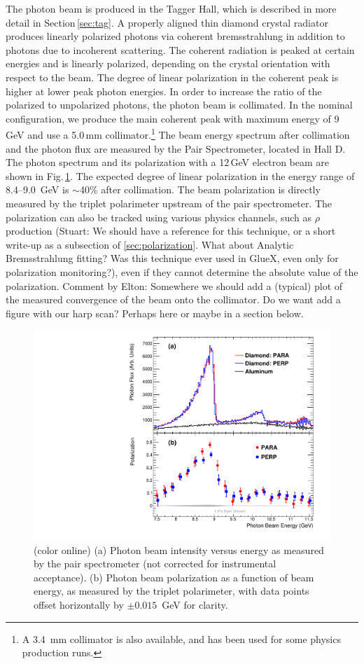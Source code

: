 The photon beam is produced in the Tagger Hall, which is described in more detail in Section\,\ref{sec:tag}.
A properly aligned thin diamond crystal radiator produces linearly polarized photons via coherent bremsstrahlung \cite{timm1969,LIVINGSTON2009205} in addition to photons due to incoherent scattering.
The coherent radiation is peaked at certain energies and is linearly polarized, depending on the crystal orientation with respect to the beam.
The degree of linear polarization in the coherent peak is higher at lower peak photon energies.
In order to increase the ratio of the polarized to unpolarized photons, the photon beam is collimated.  In the nominal \GX{} configuration, we produce the main coherent peak
with maximum energy of 9\,GeV and use a 5.0\,mm collimator.\footnote{A 3.4~mm collimator is also available, and has been used for some physics production runs.}
The beam energy spectrum after collimation and the photon flux are measured by the Pair
Spectrometer, located in Hall D. The photon spectrum and its polarization with a 12\,GeV electron beam are shown in Fig.\,\ref{fig:beam:gx3102_pi0etaAsym2016_fig0_beam}.
The expected degree of linear polarization in the energy range of 8.4--9.0~GeV is $\sim$40\% after collimation. 
The beam polarization is directly measured by the triplet polarimeter upstream of the pair spectrometer. The polarization can also be tracked using various physics channels, such as $\rho$ production {\color{red}(Stuart: We should have a reference for this technique, or a short write-up as a subsection of \ref{sec:polarization}.  What about Analytic Bremsstrahlung fitting? Was this technique ever used in GlueX, even only for polarization monitoring?)}, even if they cannot determine the absolute value of the polarization. 
{\color{red} Comment by Elton: Somewhere we should add a (typical) plot of the measured convergence of the beam onto the collimator. Do we want add a figure with our harp scan? Perhaps here or maybe in a section below.} 

  
\begin{figure}[t]
\begin{center}
 \includegraphics[clip=true,width=0.5\linewidth]{figures/gx3102_pi0etaAsym2016_fig0_beam.pdf}
\end{center}
\caption{(color online) (a) Photon beam intensity versus energy as measured by the pair spectrometer (not corrected for instrumental acceptance).  (b) Photon beam polarization as a function of beam energy, as measured by the triplet polarimeter, with data points offset horizontally by $\pm0.015$~GeV for clarity.
        }
\label{fig:beam:gx3102_pi0etaAsym2016_fig0_beam} 
\end{figure}

